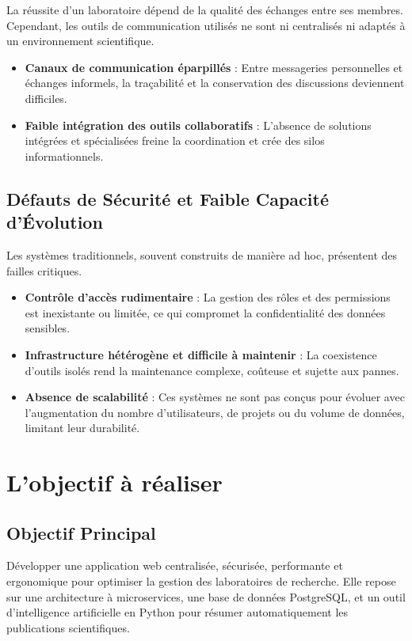 \documentclass{rapportPfe}
\begin{document}
La réussite d’un laboratoire dépend de la qualité des échanges entre ses membres. Cependant, les outils de communication utilisés ne sont ni centralisés ni adaptés à un environnement scientifique.

\begin{itemize}
  \item \textbf{Canaux de communication éparpillés} : Entre messageries personnelles et échanges informels, la traçabilité et la conservation des discussions deviennent difficiles.
  \item \textbf{Faible intégration des outils collaboratifs} : L'absence de solutions intégrées et spécialisées freine la coordination et crée des silos informationnels.
\end{itemize}

\subsection{Défauts de Sécurité et Faible Capacité d'Évolution}

Les systèmes traditionnels, souvent construits de manière ad hoc, présentent des failles critiques.

\begin{itemize}
  \item \textbf{Contrôle d’accès rudimentaire} : La gestion des rôles et des permissions est inexistante ou limitée, ce qui compromet la confidentialité des données sensibles.
  \item \textbf{Infrastructure hétérogène et difficile à maintenir} : La coexistence d’outils isolés rend la maintenance complexe, coûteuse et sujette aux pannes.
  \item \textbf{Absence de scalabilité} : Ces systèmes ne sont pas conçus pour évoluer avec l’augmentation du nombre d’utilisateurs, de projets ou du volume de données, limitant leur durabilité.
\end{itemize}

\section{L’objectif à réaliser}

\subsection{Objectif Principal}
Développer une application web centralisée, sécurisée, performante et ergonomique pour optimiser la gestion des laboratoires de recherche. Elle repose sur une architecture à microservices, une base de données PostgreSQL, et un outil d’intelligence artificielle en Python pour résumer automatiquement les publications scientifiques.
\end{document}

